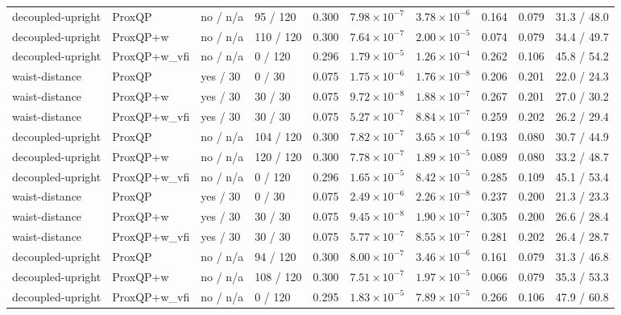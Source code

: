 \begin{tabular}{llllllllll}
decoupled-upright & ProxQP & no / n/a & 95 / 120 & 0.300 & $7.98\times 10^{-7}$ & $3.78\times 10^{-6}$ & 0.164 & 0.079 & 31.3 / 48.0 \\
decoupled-upright & ProxQP+w & no / n/a & 110 / 120 & 0.300 & $7.64\times 10^{-7}$ & $2.00\times 10^{-5}$ & 0.074 & 0.079 & 34.4 / 49.7 \\
decoupled-upright & ProxQP+w\_vfi & no / n/a & 0 / 120 & 0.296 & $1.79\times 10^{-5}$ & $1.26\times 10^{-4}$ & 0.262 & 0.106 & 45.8 / 54.2 \\
waist-distance & ProxQP & yes / 30 & 0 / 30 & 0.075 & $1.75\times 10^{-6}$ & $1.76\times 10^{-8}$ & 0.206 & 0.201 & 22.0 / 24.3 \\
waist-distance & ProxQP+w & yes / 30 & 30 / 30 & 0.075 & $9.72\times 10^{-8}$ & $1.88\times 10^{-7}$ & 0.267 & 0.201 & 27.0 / 30.2 \\
waist-distance & ProxQP+w\_vfi & yes / 30 & 30 / 30 & 0.075 & $5.27\times 10^{-7}$ & $8.84\times 10^{-7}$ & 0.259 & 0.202 & 26.2 / 29.4 \\
decoupled-upright & ProxQP & no / n/a & 104 / 120 & 0.300 & $7.82\times 10^{-7}$ & $3.65\times 10^{-6}$ & 0.193 & 0.080 & 30.7 / 44.9 \\
decoupled-upright & ProxQP+w & no / n/a & 120 / 120 & 0.300 & $7.78\times 10^{-7}$ & $1.89\times 10^{-5}$ & 0.089 & 0.080 & 33.2 / 48.7 \\
decoupled-upright & ProxQP+w\_vfi & no / n/a & 0 / 120 & 0.296 & $1.65\times 10^{-5}$ & $8.42\times 10^{-5}$ & 0.285 & 0.109 & 45.1 / 53.4 \\
waist-distance & ProxQP & yes / 30 & 0 / 30 & 0.075 & $2.49\times 10^{-6}$ & $2.26\times 10^{-8}$ & 0.237 & 0.200 & 21.3 / 23.3 \\
waist-distance & ProxQP+w & yes / 30 & 30 / 30 & 0.075 & $9.45\times 10^{-8}$ & $1.90\times 10^{-7}$ & 0.305 & 0.200 & 26.6 / 28.4 \\
waist-distance & ProxQP+w\_vfi & yes / 30 & 30 / 30 & 0.075 & $5.77\times 10^{-7}$ & $8.55\times 10^{-7}$ & 0.281 & 0.202 & 26.4 / 28.7 \\
decoupled-upright & ProxQP & no / n/a & 94 / 120 & 0.300 & $8.00\times 10^{-7}$ & $3.46\times 10^{-6}$ & 0.161 & 0.079 & 31.3 / 46.8 \\
decoupled-upright & ProxQP+w & no / n/a & 108 / 120 & 0.300 & $7.51\times 10^{-7}$ & $1.97\times 10^{-5}$ & 0.066 & 0.079 & 35.3 / 53.3 \\
decoupled-upright & ProxQP+w\_vfi & no / n/a & 0 / 120 & 0.295 & $1.83\times 10^{-5}$ & $7.89\times 10^{-5}$ & 0.266 & 0.106 & 47.9 / 60.8 \\

\end{tabular}
